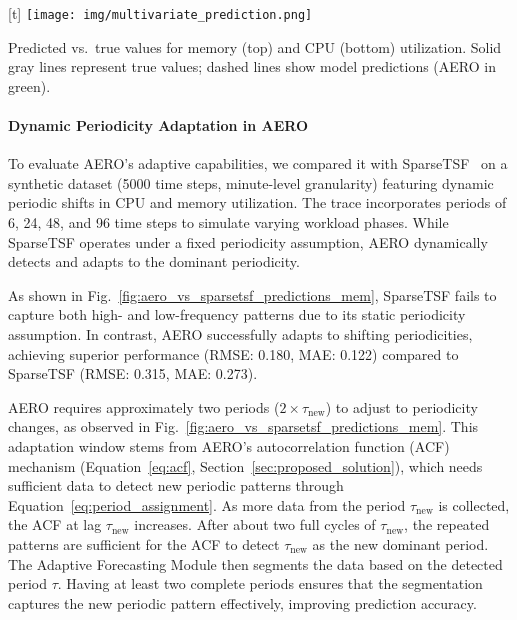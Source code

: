 \documentclass{ieeetmlcn}
\begin{document}
\par\medskip\begin{center}[t]
\centering
\texttt{[image: img/multivariate\_prediction.png]}
\caption{Predicted vs.\ true values for memory (top) and CPU (bottom) utilization. Solid gray lines represent true values; dashed lines show model predictions (AERO in green).}
\label{fig:multivariate_prediction}\end{center}\medskip\par

\paragraph*{Dynamic Periodicity Adaptation in AERO}
\label{sec:dynamicperiodicity}

To evaluate AERO's adaptive capabilities, we compared it with SparseTSF~\cite{sparseTSF} on a synthetic dataset (5000 time steps, minute-level granularity) featuring dynamic periodic shifts in CPU and memory utilization. The trace incorporates periods of 6, 24, 48, and 96 time steps to simulate varying workload phases. While SparseTSF operates under a fixed periodicity assumption, AERO dynamically detects and adapts to the dominant periodicity.

As shown in Fig.~\ref{fig:aero_vs_sparsetsf_predictions_mem}, SparseTSF fails to capture both high- and low-frequency patterns due to its static periodicity assumption. In contrast, AERO successfully adapts to shifting periodicities, achieving superior performance (RMSE: 0.180, MAE: 0.122) compared to SparseTSF (RMSE: 0.315, MAE: 0.273).

AERO requires approximately two periods ($2 \times \tau_{\text{new}}$) to adjust to periodicity changes, as observed in Fig.~\ref{fig:aero_vs_sparsetsf_predictions_mem}. This adaptation window stems from AERO's autocorrelation function (ACF) mechanism (Equation~\ref{eq:acf}, Section~\ref{sec:proposed_solution}), which needs sufficient data to detect new periodic patterns through Equation~\ref{eq:period_assignment}. As more data from the period $\tau_{\text{new}}$ is collected, the ACF at lag $\tau_{\text{new}}$ increases. After about two full cycles of $\tau_{\text{new}}$, the repeated patterns are sufficient for the ACF to detect $\tau_{\text{new}}$ as the new dominant period. The Adaptive Forecasting Module then segments the data based on the detected period $\tau$. Having at least two complete periods ensures that the segmentation captures the new periodic pattern effectively, improving prediction accuracy.
\end{document}
